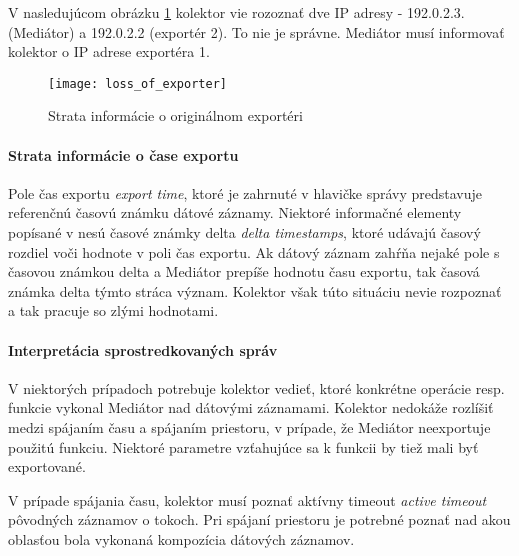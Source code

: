 V nasledujúcom obrázku \ref{o:loss_of_exporter} kolektor vie rozoznať dve IP adresy - 192.0.2.3. (Mediátor) 
a 192.0.2.2 (exportér 2). To nie je správne. Mediátor musí informovať kolektor o IP adrese exportéra 1.

\begin{figure}[ht!]
\centering
\texttt{[image: loss\_of\_exporter]}
\caption{Strata informácie o originálnom exportéri}\label{o:loss_of_exporter}
\end{figure}


\paragraph{Strata informácie o čase exportu} \label{sec:loss_time}

Pole čas exportu \emph{export time}, ktoré je zahrnuté v hlavičke správy predstavuje referenčnú 
časovú známku dátové záznamy. Niektoré informačné elementy popísané v \citep{rfc5102} nesú 
časové známky delta \emph{delta timestamps}, ktoré udávajú časový rozdiel voči hodnote v poli 
čas exportu. Ak dátový záznam zahŕňa nejaké pole s časovou známkou delta a Mediátor prepíše hodnotu 
času exportu,  tak časová známka delta týmto stráca význam. Kolektor však túto situáciu nevie 
rozpoznať a tak pracuje so zlými hodnotami.


\paragraph{Interpretácia sprostredkovaných správ}

V niektorých prípadoch potrebuje kolektor vedieť, ktoré konkrétne operácie resp. funkcie vykonal Mediátor 
nad dátovými záznamami. Kolektor nedokáže rozlíšiť medzi spájaním času a spájaním priestoru, v prípade, že 
Mediátor neexportuje použitú funkciu. Niektoré parametre vzťahujúce sa k funkcii by tiež mali byť 
exportované. 

V prípade spájania času, kolektor musí poznať aktívny timeout \emph{active timeout} 
pôvodných záznamov o tokoch. Pri spájaní priestoru je potrebné poznať nad akou oblasťou bola 
vykonaná kompozícia dátových záznamov.\citep{rfc5982}

